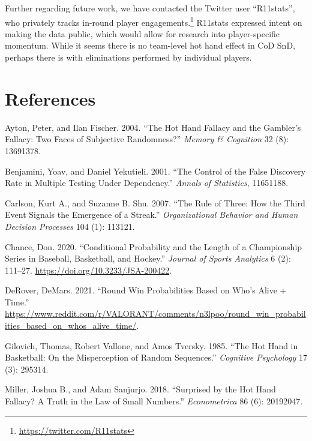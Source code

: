 \documentclass{article}
\newlength{\cslhangindent}
\newlength{\cslentryspacingunit} %
\newenvironment{CSLReferences}[2] %
 {%
  \setlength{\parindent}{0pt}
  \ifodd #1
  \let\oldpar\par
  \def\par{\hangindent=\cslhangindent\oldpar}
  \fi
  \setlength{\parskip}{#2\cslentryspacingunit}
 }%
 {}
\begin{document}
Further regarding future work, we have contacted the Twitter user
``R11stats'', who privately tracks in-round player
engagements.\footnote{\url{https://twitter.com/R11stats}} R11stats
expressed intent on making the data public, which would allow for
research into player-specific momentum. While it seems there is no
team-level hot hand effect in CoD SnD, perhaps there is with
eliminations performed by individual players.

\hypertarget{references}{%
\section*{References}\label{references}}

\hypertarget{refs}{}
\begin{CSLReferences}{1}{0}
\leavevmode{}%
Ayton, Peter, and Ilan Fischer. 2004. {``The Hot Hand Fallacy and the
Gambler{'}s Fallacy: Two Faces of Subjective Randomness?''} \emph{Memory
\& Cognition} 32 (8): 13691378.

\leavevmode{}%
Benjamini, Yoav, and Daniel Yekutieli. 2001. {``The Control of the False
Discovery Rate in Multiple Testing Under Dependency.''} \emph{Annals of
Statistics}, 11651188.

\leavevmode{}%
Carlson, Kurt A., and Suzanne B. Shu. 2007. {``The Rule of Three: How
the Third Event Signals the Emergence of a Streak.''}
\emph{Organizational Behavior and Human Decision Processes} 104 (1):
113121.

\leavevmode{}%
Chance, Don. 2020. {``Conditional Probability and the Length of a
Championship Series in Baseball, Basketball, and Hockey.''}
\emph{Journal of Sports Analytics} 6 (2): 111--27.
\url{https://doi.org/10.3233/JSA-200422}.

\leavevmode{}%
DeRover, DeMars. 2021. {``Round Win Probabilities Based on Who's Alive +
Time.''}
\url{https://www.reddit.com/r/VALORANT/comments/n3lpoo/round_win_probabilities_based_on_whos_alive_time/}.

\leavevmode{}%
Gilovich, Thomas, Robert Vallone, and Amos Tversky. 1985. {``The Hot
Hand in Basketball: On the Misperception of Random Sequences.''}
\emph{Cognitive Psychology} 17 (3): 295314.

\leavevmode{}%
Miller, Joshua B., and Adam Sanjurjo. 2018. {``Surprised by the Hot Hand
Fallacy? A Truth in the Law of Small Numbers.''} \emph{Econometrica} 86
(6): 20192047.


\end{CSLReferences}
\end{document}
